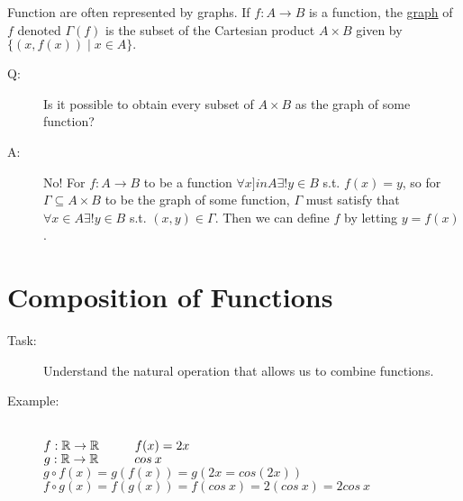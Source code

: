 \documentclass[10pt]{article}
\begin{document}
	Function are often represented by graphs. If $f:A \rightarrow B$ is a function, the \underline{graph} of $f$ denoted $\Gamma (f)$ is the subset of the Cartesian product $A \times B$ given by $\{(x, f(x)) \mid x \in A \}.$
	\begin{description}
		\item[Q:] Is it possible to obtain every subset of $A \times B$ as the graph of some function?
		\item[A:] No! For $f:A \rightarrow B$ to be a function $\forall x ]in A \exists! y \in B$ s.t. $f(x)=y$, so for $\Gamma \subseteq A \times B$ to be the graph of some function, $\Gamma$ must satisfy that $\forall x \in A \exists! y \in B$ s.t. $(x, y) \in \Gamma$. Then we can define $f$ by letting $y = f(x)$.
	\end{description}
	
	\section{Composition of Functions}
	\begin{description}
		\item[Task:] Understand the natural operation that allows us to combine functions.
		\begin{figure}[h]
			\centering
		\end{figure}
		\item[Example:] ~\\
		$f: \mathbb{R} \rightarrow \mathbb{R} \hspace{10mm} f(x) = 2x$ \\
		$g: \mathbb{R} \rightarrow \mathbb{R} \hspace{10mm} cos \: x$ \\
		$g \circ f(x) = g(f(x)) = g(2x = cos(2x))$ \\
		$f \circ g(x) = f(g(x)) = f(cos \: x) = 2(cos \: x) = 2 cos \: x$
	\end{description}
\end{document}
